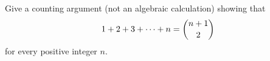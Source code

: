 Give a counting argument (not an algebraic calculation) showing that
\[1+2+3+\cdots+n=\dbinom{n+1}{2}\]
for every positive integer $n$.
